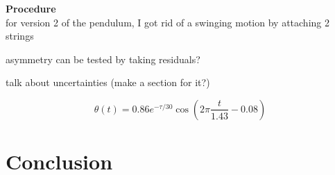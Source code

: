 \documentclass[12pt]{article}
\begin{document}
\textbf{Procedure}\\
for version 2 of the pendulum, I got rid of a swinging motion by attaching 2 strings

asymmetry can be tested by taking residuals?

talk about uncertainties (make a section for it?)

\begin{equation}
    \theta(t) = 0.86 e^{-{\tau/30}} \cos\left(2 \pi \frac{t}{1.43} - 0.08\right)
\end{equation}

\section*{Conclusion}

\newpage

\printbibliography
\end{document}

